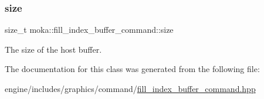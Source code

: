 \subsubsection{\texorpdfstring{size}{size}}
{\footnotesize\ttfamily size\+\_\+t moka\+::fill\+\_\+index\+\_\+buffer\+\_\+command\+::size}

The size of the host buffer. 

The documentation for this class was generated from the following file\+:\begin{DoxyCompactItemize}
\item 
engine/includes/graphics/command/\mbox{\hyperlink{fill__index__buffer__command_8hpp}{fill\+\_\+index\+\_\+buffer\+\_\+command.\+hpp}}\end{DoxyCompactItemize}
